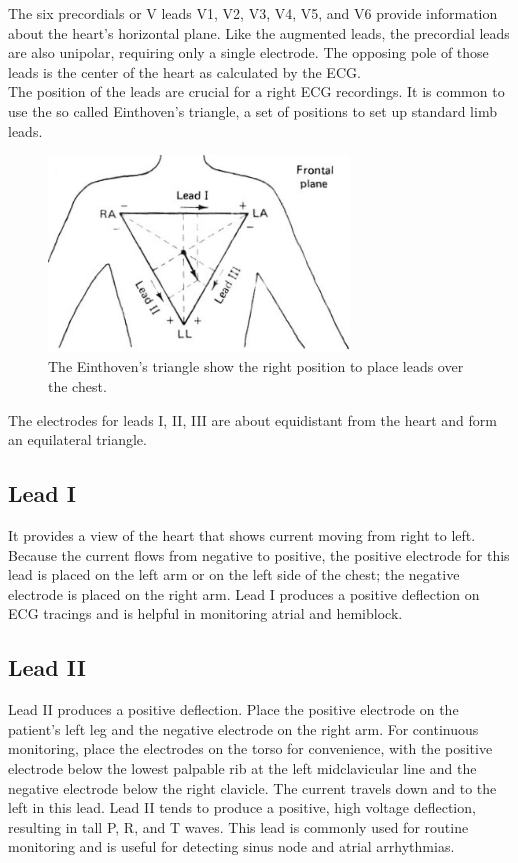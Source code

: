 The six precordials or V leads V1, V2, V3, V4, V5, and V6 provide information about the heart’s horizontal plane. Like the augmented leads, the precordial leads are also unipolar, requiring only a single electrode. The opposing pole of those leads is the center of the heart as calculated by the ECG.\\
The position of the leads are crucial for a right ECG recordings. It is common to use the so called Einthoven’s triangle, a set of positions to set up standard limb leads.
\begin{figure}[ht!]
	\centering
	\includegraphics[width=80mm]{figures/ch2/6.png}
	\caption{The Einthoven’s triangle show the right position to place leads over the chest.}
	\label{fig2.6}
\end{figure}
The electrodes for leads I, II, III are about equidistant from the heart and form an equilateral triangle.

\subsection{Lead I}
It provides a view of the heart that shows current moving from right to left. Because the current flows from negative to positive, the positive electrode for this lead is placed on the left arm or on the left side of the chest; the negative electrode is placed on the right arm. Lead I produces a positive deflection on ECG tracings and is helpful in monitoring atrial and hemiblock.

\subsection{Lead II}
Lead II produces a positive deflection. Place the positive electrode on the patient’s left leg and the negative electrode on the right arm. For continuous monitoring, place the electrodes on the torso for convenience, with the positive electrode below the lowest palpable rib at the left midclavicular line and the negative electrode below the right clavicle. The current travels down and to the left in this lead. Lead II tends to produce a positive, high voltage deflection, resulting in tall P, R, and T waves. This lead is commonly used for routine monitoring and is useful for detecting sinus node and atrial arrhythmias.


